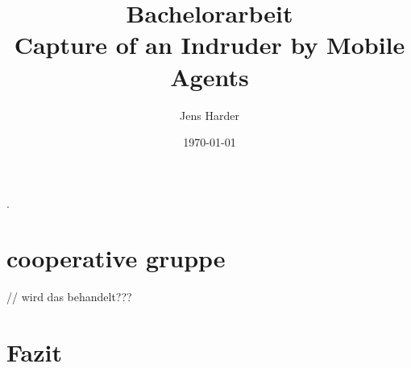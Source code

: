 \documentclass{article}
\title{Bachelorarbeit\\
	Capture of an Indruder by Mobile Agents}
\author{Jens Harder}
\date{\today}
\begin{document}
	\maketitle
	\newpage
	
	.
	\tableofcontents
	
	\newpage
	
	
	
	

	
	
	\section{cooperative gruppe}
	// wird das behandelt???
	
	\section{Fazit}
	
	
\end{document}
